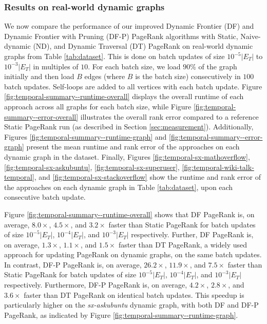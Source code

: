 \subsubsection{Results on real-world dynamic graphs}

We now compare the performance of our improved Dynamic Frontier (DF) and Dynamic Frontier with Pruning (DF-P) PageRank algorithms with Static, Naive-dynamic (ND), and Dynamic Traversal (DT) PageRank on real-world dynamic graphs from Table \ref{tab:dataset}. This is done on batch updates of size $10^{-5}|E_T|$ to $10^{-3}|E_T|$ in multiples of $10$. For each batch size, we load $90\%$ of the graph initially and then load $B$ edges (where $B$ is the batch size) consecutively in $100$ batch updates. Self-loops are added to all vertices with each batch update. Figure \ref{fig:temporal-summary--runtime-overall} displays the overall runtime of each approach across all graphs for each batch size, while Figure \ref{fig:temporal-summary--error-overall} illustrates the overall rank error compared to a reference Static PageRank run (as described in Section \ref{sec:measurement}). Additionally, Figures \ref{fig:temporal-summary--runtime-graph} and \ref{fig:temporal-summary--error-graph} present the mean runtime and rank error of the approaches on each dynamic graph in the dataset. Finally, Figures \ref{fig:temporal-sx-mathoverflow}, \ref{fig:temporal-sx-askubuntu}, \ref{fig:temporal-sx-superuser}, \ref{fig:temporal-wiki-talk-temporal}, and \ref{fig:temporal-sx-stackoverflow} show the runtime and rank error of the approaches on each dynamic graph in Table \ref{tab:dataset}, upon each consecutive batch update.

Figure \ref{fig:temporal-summary--runtime-overall} shows that DF PageRank is, on average, $8.0\times$, $4.5\times$, and $3.2\times$ faster than Static PageRank for batch updates of size $10^{-5}|E_T|$, $10^{-4}|E_T|$, and $10^{-3}|E_T|$ respectively. Further, DF PageRank is, on average, $1.3\times$, $1.1\times$, and $1.5\times$ faster than DT PageRank, a widely used approach for updating PageRank on dynamic graphs, on the same batch updates. In contrast, DF-P PageRank is, on average, $26.2\times$, $11.9\times$, and $7.5\times$ faster than Static PageRank for batch updates of size $10^{-5}|E_T|$, $10^{-4}|E_T|$, and $10^{-3}|E_T|$ respectively. Furthermore, DF-P PageRank is, on average, $4.2\times$, $2.8\times$, and $3.6\times$ faster than DT PageRank on identical batch updates. This speedup is particularly higher on the \textit{sx-askubuntu} dynamic graph, with both DF and DF-P PageRank, as indicated by Figure \ref{fig:temporal-summary--runtime-graph}.

